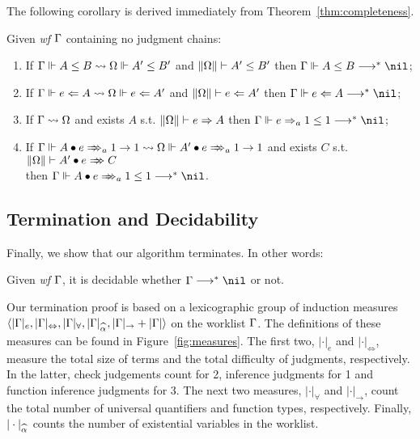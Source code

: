 The following corollary is derived immediately from Theorem~\ref{thm:completeness}.
\begin{corollary}
Given \emph{wf }$\Gamma$ containing no judgment chains:
\begin{enumerate}
    \item If $\Gamma \Vdash A \le B \rightsquigarrow \Omega \Vdash A' \le B'$ and $\|\Omega\| \vdash A' \le B'$
        then $\Gm \Vdash A \le B \redto \nil$;
    \item If $\Gamma \Vdash e \Leftarrow A \rightsquigarrow \Omega \Vdash e \Leftarrow A'$ and $\|\Omega\| \vdash e \Leftarrow A'$
        then $\Gm \Vdash e \Lto A \redto \nil$;
    \item If $\Gamma \rightsquigarrow \Omega$ and exists $A$ s.t. $\|\Omega\| \vdash e \Rightarrow A$
        then $\Gm \Vdash e \To_a 1 \le 1 \redto \nil$;
    \item If $\Gm \Vdash \appInfAlg{A}{e}[a][1 \to 1] \sto \Om \Vdash \appInfAlg{A'}{e}[a][1 \to 1]$
        and exists $C$ s.t. $\|\Om\| \vdash \appInf{A'}{e}{C}$
        \\
        then $\Gm \Vdash \appInfAlg{A}{e}[a][1 \le 1] \redto \nil$.
\end{enumerate}
\end{corollary}

\subsection{Termination and Decidability}

Finally, we show that our algorithm terminates. In other words:
\begin{theorem}[Decidability]
Given \emph{wf }$\Gamma$, it is decidable whether $\Gm\redto\nil$ or not.
\end{theorem}
Our termination proof is based on a lexicographic group of induction measures\\
$\langle |\Gm|_e, |\Gm|_\Leftrightarrow, |\Gm|_\forall, |\Gm|_{\al}, |\Gm|_\to + |\Gm| \rangle$
on the worklist $\Gamma$. The definitions of these measures can be found in Figure~\ref{fig:measures}. The first two, 
$|\cdot|_e$ and $|\cdot|_\Leftrightarrow$, measure the total size of terms
and the total difficulty of judgments, respectively. In the latter, check judgements
count for 2, inference judgments for 1 and function inference judgments for 3.
The next two measures, $|\cdot|_\forall$ and $|\cdot|_\to$, count the total number of
universal quantifiers and function types, respectively. Finally,
$|\cdot|_{\al}$ counts the number of existential variables in the worklist.

